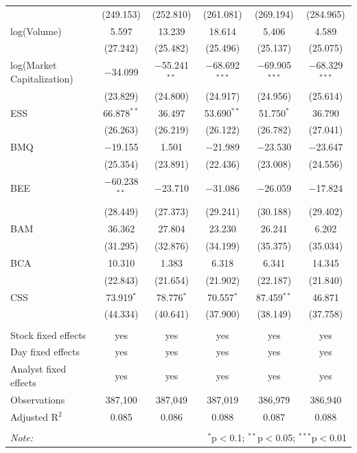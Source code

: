 \begin{tabular}{@{\extracolsep{5pt}}lccccc}
  & (249.153) & (252.810) & (261.081) & (269.194) & (284.965) \\ 
  log(Volume) & 5.597 & 13.239 & 18.614 & 5.406 & 4.589 \\ 
  & (27.242) & (25.482) & (25.496) & (25.137) & (25.075) \\ 
  log(Market Capitalization) & $-$34.099 & $-$55.241$^{**}$ & $-$68.692$^{***}$ & $-$69.905$^{***}$ & $-$68.329$^{***}$ \\ 
  & (23.829) & (24.800) & (24.917) & (24.956) & (25.614) \\ 
  ESS & 66.878$^{**}$ & 36.497 & 53.690$^{**}$ & 51.750$^{*}$ & 36.790 \\ 
  & (26.263) & (26.219) & (26.122) & (26.782) & (27.041) \\ 
  BMQ & $-$19.155 & 1.501 & $-$21.989 & $-$23.530 & $-$23.647 \\ 
  & (25.354) & (23.891) & (22.436) & (23.008) & (24.556) \\ 
  BEE & $-$60.238$^{**}$ & $-$23.710 & $-$31.086 & $-$26.059 & $-$17.824 \\ 
  & (28.449) & (27.373) & (29.241) & (30.188) & (29.402) \\ 
  BAM & 36.362 & 27.804 & 23.230 & 26.241 & 6.202 \\ 
  & (31.295) & (32.876) & (34.199) & (35.375) & (35.034) \\ 
  BCA & 10.310 & 1.383 & 6.318 & 6.341 & 14.345 \\ 
  & (22.843) & (21.654) & (21.902) & (22.187) & (21.840) \\ 
  CSS & 73.919$^{*}$ & 78.776$^{*}$ & 70.557$^{*}$ & 87.459$^{**}$ & 46.871 \\ 
  & (44.334) & (40.641) & (37.900) & (38.149) & (37.758) \\ 
 \hline \\[-1.8ex] 
Stock fixed effects & yes & yes & yes & yes & yes \\ 
Day fixed effects & yes & yes & yes & yes & yes \\ 
Analyst fixed effects & yes & yes & yes & yes & yes \\ 
Observations & 387,100 & 387,049 & 387,019 & 386,979 & 386,940 \\ 
Adjusted R$^{2}$ & 0.085 & 0.086 & 0.088 & 0.087 & 0.088 \\ 
\hline 
\hline \\[-1.8ex] 
\textit{Note:}  & \multicolumn{5}{r}{$^{*}$p$<$0.1; $^{**}$p$<$0.05; $^{***}$p$<$0.01} \\ 
\end{tabular} 
